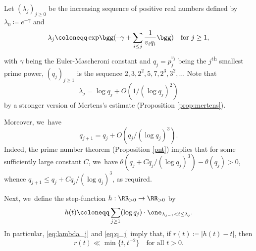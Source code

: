 Let $(\lambda_j)_{j \ge 0}$ be the increasing sequence of positive real numbers defined by $\lambda_0 \coloneqq e^{-\gamma}$ and
\[
\lambda_j \coloneqq \exp\!\bgg(\!-\gamma+ \sum_{i \le j} \frac{1}{v_iq_i}\bgg)\quad \text{for $j \ge 1$},
\]
with $\gamma$ being the Euler-Mascheroni constant and $q_j = p_j^{v_j}$ being the $j$\textsuperscript{th} smallest prime power, \ie $(q_j)_{j \ge 1}$ is the sequence $2, 3, 2^2, 5, 7, 2^3, 3^2,\dots$ Note that
\begin{equation}
\label{eq:lambda_j}
\lambda_j = \log q_j +O(1/(\log q_j)^2)
\end{equation}
by a stronger version of Mertens's estimate (Proposition \ref{prop:mertens}).

Moreover, we~have
\begin{equation}
\label{eq:q_j}
q_{j+1} = q_j+O(q_j/(\log q_j)^3).
\end{equation}
Indeed, the prime number theorem (Proposition \ref{pnt}) implies that for some sufficiently large constant $C$, we~have $\theta(q_j+Cq_j/(\log q_j)^3) -\theta(q_j)>0$, whence $q_{j+1}\le q_j+Cq_j/(\log q_j)^3$, as required.

Next, we~define the step-function $h:\RR_{>0} \to \RR_{>0}$ by
\begin{equation}
\label{eq:h(t) dfn}
h(t) \coloneqq \sum_{j \ge 1} (\log q_j) \cdot \one_{\lambda_{j-1} < t \le \lambda_j}.
\end{equation}
In particular, \eqref{eq:lambda_j} and \eqref{eq:q_j} imply that, if $r(t) \coloneqq |h(t) - t|$, then
\begin{equation}
\label{eq:h(t) estimate}
r(t) \ll \min\{t, t^{-2}\} \quad \text{for all $t > 0$.}
\end{equation}

